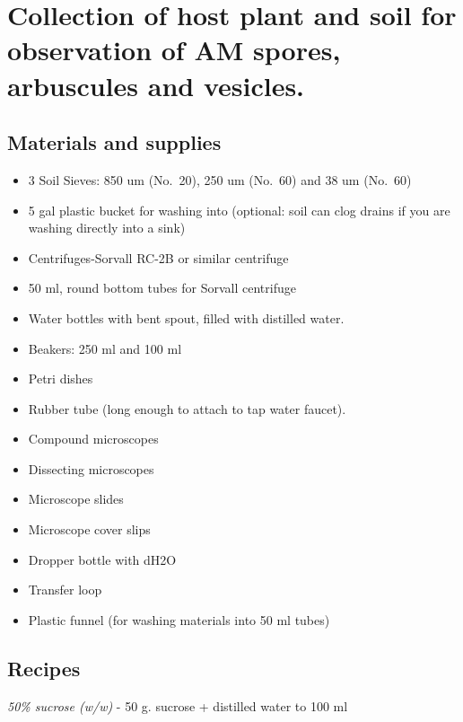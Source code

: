 \documentclass[]{book}
\providecommand{\tightlist}{%
  \setlength{\itemsep}{0pt}\setlength{\parskip}{0pt}}
\begin{document}
\hypertarget{collection-of-host-plant-and-soil-for-observation-of-am-spores-arbuscules-and-vesicles.}{%
\section{Collection of host plant and soil for observation of AM spores, arbuscules and vesicles.}\label{collection-of-host-plant-and-soil-for-observation-of-am-spores-arbuscules-and-vesicles.}}

\hypertarget{materials-and-supplies}{%
\subsection{Materials and supplies}\label{materials-and-supplies}}

\begin{itemize}
\tightlist
\item
  3 Soil Sieves: 850 um (No.~20), 250 um (No.~60) and 38 um (No.~60)
\item
  5 gal plastic bucket for washing into (optional: soil can clog drains if you are washing directly into a sink)
\item
  Centrifuges-Sorvall RC-2B or similar centrifuge
\item
  50 ml, round bottom tubes for Sorvall centrifuge
\item
  Water bottles with bent spout, filled with distilled water.
\item
  Beakers: 250 ml and 100 ml
\item
  Petri dishes
\item
  Rubber tube (long enough to attach to tap water faucet).
\item
  Compound microscopes
\item
  Dissecting microscopes
\item
  Microscope slides
\item
  Microscope cover slips
\item
  Dropper bottle with dH2O
\item
  Transfer loop
\item
  Plastic funnel (for washing materials into 50 ml tubes)
\end{itemize}

\hypertarget{recipes}{%
\subsection{Recipes}\label{recipes}}

\emph{50\% sucrose (w/w)} - 50 g. sucrose + distilled water to 100 ml
\end{document}
